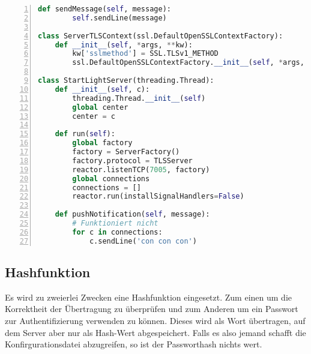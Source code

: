 \begin{lstlisting}[caption =Implementierung des SSL Servers, language=python, frame=single, breaklines=true,columns=fullflexible, commentstyle=\color{gray}\upshape, captionpos=b, numbers = left]
    def sendMessage(self, message):
        self.sendLine(message)

class ServerTLSContext(ssl.DefaultOpenSSLContextFactory):
    def __init__(self, *args, **kw):
        kw['sslmethod'] = SSL.TLSv1_METHOD
        ssl.DefaultOpenSSLContextFactory.__init__(self, *args, **kw)

class StartLightServer(threading.Thread):
    def __init__(self, c):
        threading.Thread.__init__(self)
        global center
        center = c

    def run(self):
        global factory
        factory = ServerFactory()
        factory.protocol = TLSServer
        reactor.listenTCP(7005, factory)
        global connections
        connections = []
        reactor.run(installSignalHandlers=False)

    def pushNotification(self, message):
        # Funktioniert nicht
        for c in connections:
            c.sendLine('con con con')

\end{lstlisting}


\subsection{Hashfunktion}
Es wird zu zweierlei Zwecken eine Hashfunktion eingesetzt. Zum einen um die Korrektheit der Übertragung zu überprüfen und zum Anderen um ein Passwort zur Authentifizierung verwenden zu können. Dieses wird als Wort übertragen, auf dem Server aber nur als Hash-Wert abgespeichert. Falls es also jemand schafft die Konfirgurationsdatei abzugreifen, so ist der Passworthash nichts wert.
